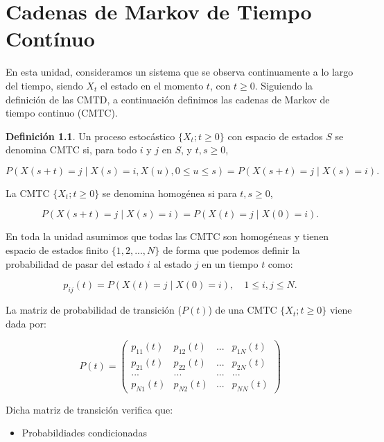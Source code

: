 \documentclass[
]{book}
\providecommand{\tightlist}{%
  \setlength{\itemsep}{0pt}\setlength{\parskip}{0pt}}
\newenvironment{yellowbox}{
  \definecolor{shadecolor}{rgb}{210, 180, 140}  
  \color{black}
  \begin{shaded}}
 {\end{shaded}}
\theoremstyle{definition}
\newtheorem{definition}{Definición}[chapter]
\theoremstyle{definition}
\theoremstyle{definition}
\theoremstyle{definition}
\theoremstyle{remark}
\begin{document}
\hypertarget{CMTC}{%
\chapter{Cadenas de Markov de Tiempo Contínuo}\label{CMTC}}

En esta unidad, consideramos un sistema que se observa continuamente a lo largo del tiempo, siendo \(X_t\) el estado en el momento \(t\), con \(t \geq 0\). Siguiendo la definición de las CMTD, a continuación definimos las cadenas de Markov de tiempo continuo (CMTC).

\begin{yellowbox}

\begin{definition}
\protect\hypertarget{def:cmtc001}{}\label{def:cmtc001}Un proceso estocástico \(\{X_t; t \geq 0\}\) con espacio de estados \(S\) se denomina CMTC si, para todo \(i\) y \(j\) en \(S\), y \(t, s \geq 0\),

\[P(X(s+t) = j \mid X(s) = i, X(u), 0 \leq u \leq s) = P(X(s+t) = j \mid X(s) = i).\]
\end{definition}

\end{yellowbox}

La CMTC \(\{X_t; t \geq 0\}\) se denomina homogénea si para \(t, s \geq 0\),

\[P(X(s+t) = j \mid X(s) = i) = P(X(t) = j \mid X(0) = i).\]

En toda la unidad asumimos que todas las CMTC son homogéneas y tienen espacio de estados finito \(\{1, 2,...,N\}\) de forma que podemos definir la probabilidad de pasar del estado \(i\) al estado \(j\) en un tiempo \(t\) como:

\[p_{ij}(t) = P(X(t) = j \mid X(0) = i), \quad 1 \leq i, j \leq N.\]

La matriz de probabilidad de transición (\(P(t)\)) de una CMTC \(\{X_t; t \geq 0\}\) viene dada por:

\[P(t) = 
\begin{pmatrix}
p_{11}(t) & p_{12}(t) & ... & p_{1N}(t)\\
p_{21}(t) & p_{22}(t) & ... & p_{2N}(t)\\
... & ... & ... & ...\\
p_{N1}(t) & p_{N2}(t) & ... & p_{NN}(t)
\end{pmatrix}\]

Dicha matriz de transición verifica que:

\begin{itemize}
\tightlist
\item
  Probabildiades condicionadas
\end{itemize}
\end{document}
